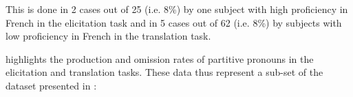 \documentclass[output=paper,modfonts,nonflat,newtxmath]{langsci/langscibook}
\begin{document}
\z

This is done in 2 cases out of 25 (i.e. 8\%) by one subject with high proficiency in French in the elicitation task and in 5 cases out of 62 (i.e. 8\%) by subjects with low proficiency in French in the translation task.


 highlights the production and omission rates of partitive pronouns in the elicitation and translation tasks. These data thus represent a sub-set of the dataset presented in :
\end{document}
